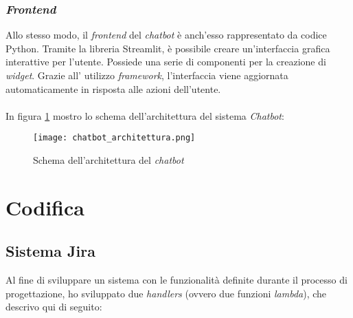 \subsubsection{\textit{Frontend}}
Allo stesso modo, il \textit{frontend} del \textit{chatbot} è anch'esso rappresentato da codice Python. Tramite la libreria Streamlit, è possibile creare un'interfaccia grafica interattive per l'utente. Possiede una serie di componenti per la creazione di \textit{widget}. Grazie all' utilizzo \textit{framework}, l'interfaccia viene aggiornata automaticamente in risposta alle azioni dell'utente. \\ \\
\noindent
In figura \ref{fig:architetturaChatbot} mostro lo schema dell'architettura del sistema \textit{Chatbot}:
\begin{figure}[H]
    \centering
    \texttt{[image: chatbot\_architettura.png]}
    \caption{Schema dell'architettura del \textit{chatbot}}
    \label{fig:architetturaChatbot}
\end{figure}

\section{Codifica}
\subsection{Sistema Jira}

Al fine di sviluppare un sistema con le funzionalità definite durante il processo di progettazione, ho sviluppato due \textit{handlers} (ovvero due funzioni \textit{lambda}), che descrivo qui di seguito:

